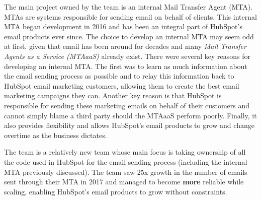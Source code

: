 The main project owned by the \team{} team is an internal Mail Transfer Agent (MTA). MTAs are systems responsible for sending email on behalf of clients. This internal MTA began development in 2016 and has been an integral part of HubSpot's email products ever since. The choice to develop an internal MTA may seem odd at first, given that email has been around for decades and many \textit{Mail Transfer Agents as a Service (MTAaaS)} already exist. There were several key reasons for developing an internal MTA. The first was to learn as much information about the email sending process as possible and to relay this information back to HubSpot email marketing customers, allowing them to create the best email marketing campaigns they can. Another key reason is that HubSpot is responsible for sending these marketing emails on behalf of their customers and cannot simply blame a third party should the MTAaaS perform poorly. Finally, it also provides flexibility and allows HubSpot's email products to grow and change overtime as the business dictates.  

The \team{} team is a relatively new team whose main focus is taking ownership of all the code used in HubSpot for the email sending process (including the internal MTA previously discussed). The team saw 25x growth in the number of emails sent through their MTA in 2017 and managed to become \textbf{more} reliable while scaling, enabling HubSpot's email products to grow without constraints.  